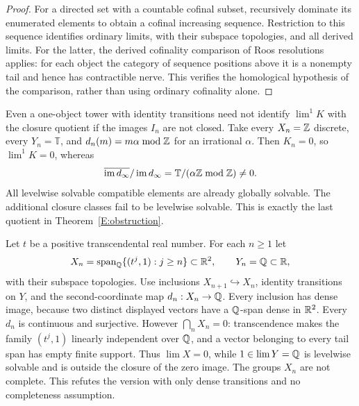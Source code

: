 \begin{proof}
For a directed set with a countable cofinal subset, recursively dominate its enumerated elements to obtain a cofinal increasing sequence. Restriction to this sequence identifies ordinary limits, with their subspace topologies, and all derived limits. For the latter, the derived cofinality comparison of Roos resolutions applies: for each object the category of sequence positions above it is a nonempty tail and hence has contractible nerve. This verifies the homological hypothesis of the comparison, rather than using ordinary cofinality alone.
\end{proof}

\begin{example}\label{E:local-closure}
Even a one-object tower with identity transitions need not identify $\lim^1K$ with the closure quotient if the images $I_n$ are not closed. Take every $X_n=\mathbb Z$ discrete, every $Y_n=\mathbb T$, and $d_n(m)=m\alpha\bmod\mathbb Z$ for an irrational $\alpha$. Then $K_n=0$, so $\lim^1K=0$, whereas
\[
 \overline{\operatorname{im} d_\infty}/\operatorname{im} d_\infty
       =\mathbb T/(\alpha\mathbb Z\bmod\mathbb Z)\ne0.
\]
All levelwise solvable compatible elements are already globally solvable. The additional closure classes fail to be levelwise solvable. This is exactly the last quotient in Theorem~\ref{E:obstruction}.
\end{example}

\begin{example}\label{E:incomplete}
Let $t$ be a positive transcendental real number. For each $n\geq1$ let
\[
 X_n=\operatorname{span}_{\mathbb Q}\{(t^j,1):j\geq n\}\subset\mathbb R^2,
 \qquad Y_n=\mathbb Q\subset\mathbb R,
\]
with their subspace topologies. Use inclusions $X_{n+1}\hookrightarrow X_n$, identity transitions on $Y$, and the second-coordinate map $d_n:X_n\to\mathbb Q$. Every inclusion has dense image, because two distinct displayed vectors have a $\mathbb Q$-span dense in $\mathbb R^2$. Every $d_n$ is continuous and surjective. However $\bigcap_nX_n=0$: transcendence makes the family $(t^j,1)$ linearly independent over $\mathbb Q$, and a vector belonging to every tail span has empty finite support. Thus $\lim X=0$, while $1\in\lim Y=\mathbb Q$ is levelwise solvable and is outside the closure of the zero image. The groups $X_n$ are not complete. This refutes the version with only dense transitions and no completeness assumption.
\end{example}

